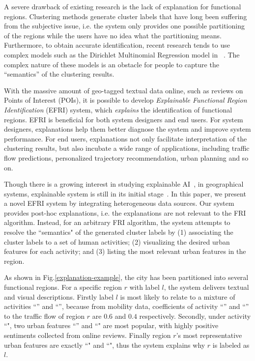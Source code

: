 \documentclass[runningheads]{llncs}
\begin{document}
A severe drawback of existing research is the lack of explanation for functional regions.
Clustering methods generate cluster labels that have long been suffering from the subjective issue, i.e. the system only provides one possible partitioning of the regions while the users have no idea what the partitioning means. 
Furthermore, to obtain accurate identification, recent research tends to use complex models such as the Dirichlet Multinomial Regression model in~\cite{Yuan2015FunctionRegion} . 
The complex nature of these models is an obstacle for people to capture the ``semantics'' of the clustering results. 

With the massive amount of geo-tagged textual data online, such as reviews on Points of Interest (POIs), it is possible to develop  \emph{Explainable Functional Region Identification} (EFRI) system, which \emph{explains} the identification of functional regions. 
EFRI is beneficial for both system designers and end users.
For system designers, explanations help them better diagnose the system and improve system performance. 
For end users, explanations not only facilitate interpretation of the clustering results, but also incubate a wide range of applications, including traffic flow predictions, personalized trajectory recommendation, urban planning and so on. 

Though there is a growing interest in studying explainable AI~\cite{Preece2018ExplainAI}, in geographical systems, explainable system is still in its initial stage~\cite{Korpan2017navigation,Jose2018cognitive}.
In this paper, we present a novel EFRI system by integrating heterogeneous data sources. Our system provides post-hoc explanations, i.e. the explanations are not relevant to the FRI algorithm. Instead, for an arbitrary FRI algorithm, the system attempts to resolve the ``semantics" of the generated cluster labels by (1) associating the cluster labels to a set of human activities; (2) visualizing the desired urban features for each activity; and (3) listing the most relevant urban features in the region. 

As shown in Fig.\ref{explanation-example}, the city has been partitioned into several functional regions. For a specific region $r$ with label $l$, the system delivers textual and visual descriptions. Firstly label $l$ is most likely to relate to a mixture of activities ``'' and ``'', because from mobility data, coefficients of activity ``'' and ``'' to the traffic flow of region $r$ are $0.6$ and $0.4$ respectively. Secondly, under activity ``", two urban features ``'' and ``" are most popular, with highly positive sentiments collected from online reviews. Finally region $r$'s most representative urban features are exactly ``" and ``", thus the system explains why $r$ is labeled as $l$.  
\end{document}
